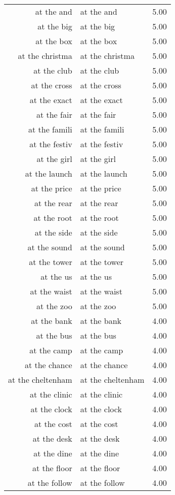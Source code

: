\begin{table}[ht]
\begin{tabular}{rlr}
  at the and & at the and & 5.00 \\ 
  at the big & at the big & 5.00 \\ 
  at the box & at the box & 5.00 \\ 
  at the christma & at the christma & 5.00 \\ 
  at the club & at the club & 5.00 \\ 
  at the cross & at the cross & 5.00 \\ 
  at the exact & at the exact & 5.00 \\ 
  at the fair & at the fair & 5.00 \\ 
  at the famili & at the famili & 5.00 \\ 
  at the festiv & at the festiv & 5.00 \\ 
  at the girl & at the girl & 5.00 \\ 
  at the launch & at the launch & 5.00 \\ 
  at the price & at the price & 5.00 \\ 
  at the rear & at the rear & 5.00 \\ 
  at the root & at the root & 5.00 \\ 
  at the side & at the side & 5.00 \\ 
  at the sound & at the sound & 5.00 \\ 
  at the tower & at the tower & 5.00 \\ 
  at the us & at the us & 5.00 \\ 
  at the waist & at the waist & 5.00 \\ 
  at the zoo & at the zoo & 5.00 \\ 
  at the bank & at the bank & 4.00 \\ 
  at the bus & at the bus & 4.00 \\ 
  at the camp & at the camp & 4.00 \\ 
  at the chance & at the chance & 4.00 \\ 
  at the cheltenham & at the cheltenham & 4.00 \\ 
  at the clinic & at the clinic & 4.00 \\ 
  at the clock & at the clock & 4.00 \\ 
  at the cost & at the cost & 4.00 \\ 
  at the desk & at the desk & 4.00 \\ 
  at the dine & at the dine & 4.00 \\ 
  at the floor & at the floor & 4.00 \\ 
  at the follow & at the follow & 4.00 \\ 

\end{tabular}
\end{table}
